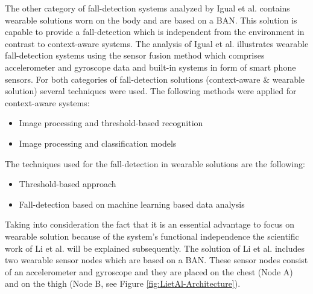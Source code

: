 \documentclass[review]{elsarticle}
\begin{document}
The other category of fall-detection systems analyzed by Igual et al. \cite{Igual2013} contains wearable solutions worn on the body and are based on a BAN. This solution is capable to provide a fall-detection which is independent from the environment in contrast to context-aware systems. The analysis of Igual et al. \cite{Igual2013} illustrates wearable fall-detection systems using the sensor fusion method which comprises accelerometer and gyroscope data and built-in systems in form of smart phone sensors. For both categories of fall-detection solutions (context-aware \& wearable solution) several techniques were used. The following methods were applied for context-aware systems:
\begin{itemize}
	\item Image processing and threshold-based recognition
	\item Image processing and classification models
\end{itemize} 
The techniques used for the fall-detection in wearable solutions are the following:
\begin{itemize}
	\item Threshold-based approach
	\item Fall-detection based on machine learning based data analysis
\end{itemize}
Taking into consideration the fact that it is an essential advantage to focus on wearable solution because of the system's functional independence the scientific work of Li et al. \cite{Li2009} will be explained subsequently. The solution of Li et al. \cite{Li2009} includes two wearable sensor nodes which are based on a BAN. These sensor nodes consist of an accelerometer and gyroscope and they are placed on the chest (Node A) and on the thigh (Node B, see Figure \ref{fig:LietAl-Architecture}). 
\end{document}

